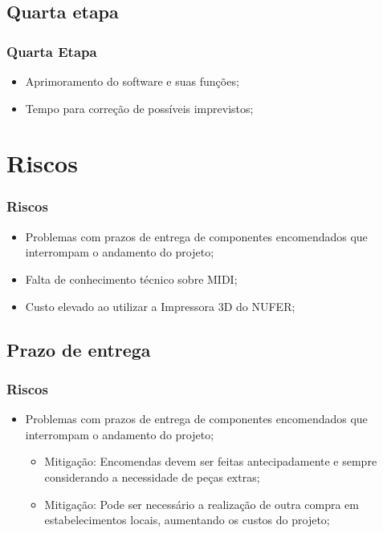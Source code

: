 \documentclass[hyperref={pdfpagelabels=false}]{beamer}
\begin{document}
        \subsection{Quarta etapa}

            \begin{frame}\frametitle{Quarta Etapa}

        	   \begin{itemize}
       	             \item Aprimoramento do software e suas funções;
        	         \item Tempo para correção de possíveis imprevistos;
               \end{itemize}

            \end{frame}

    \section{Riscos}

    	 \begin{frame}\frametitle{Riscos}
    	
            \begin{itemize}
       	        \item Problemas com prazos de entrega de componentes encomendados que interrompam o andamento do projeto;
        	    \item Falta de conhecimento técnico sobre MIDI;
    	        \item Custo elevado ao utilizar a Impressora 3D do NUFER;
            \end{itemize}

        \end{frame}

        \subsection{Prazo de entrega}

           \begin{frame}\frametitle{Riscos}

        	   \begin{itemize}
        	       \item Problemas com prazos de entrega de componentes encomendados que interrompam o andamento do projeto;
        	           \begin{itemize}
           	     	        \item Mitigação: Encomendas devem ser feitas antecipadamente e sempre considerando a necessidade de peças extras;
            	       		\item Mitigação: Pode ser necessário a realização de outra compra em estabelecimentos locais, aumentando os custos do projeto;
        	           \end{itemize}
               \end{itemize}

           \end{frame}
\end{document}

